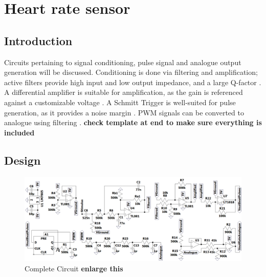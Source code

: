 \chapter{Heart rate sensor}\label{ch:heartRate}

\section{Introduction} \label{sec:heartIntro}
Circuits pertaining to signal conditioning, pulse signal and analogue output generation will be discussed. Conditioning is done via filtering and amplification; active filters provide high input and low output impedance, and a large Q-factor \cite{actpas}. A differential amplifier is suitable for amplification, as the gain is referenced against a customizable voltage \cite{opamp}. A Schmitt Trigger is well-suited for pulse generation, as it provides a noise margin \cite{schmitt}. PWM signals can be converted to analogue using filtering \cite{PWM}. \textbf{check template at end to make sure everything is included}

\section{Design} \label{sec:heartDesign}
\begin{figure}[h]
    \centering
    \vspace{-0.7cm}
    \includegraphics[width = 1\textwidth]{Figures/circuit}
    \caption{Complete Circuit \textbf{enlarge this}}
    \label{fig:circuit}
\end{figure}

